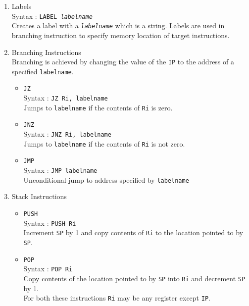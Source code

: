 \documentclass[11pt]{article}
\begin{document}
\begin{enumerate}
\item Labels \\
Syntax : \texttt{LABEL \textit{labelname}} \\
Creates a label with a \texttt{\textit{labelname}}  which is a string. Labels are used in branching instruction to specify memory location of target instructions.


\item Branching Instructions\\
Branching is achieved by changing the value of the \texttt{IP} to the address of a specified \texttt{labelname}. 
 
\begin{itemize}
\item \texttt{JZ}\\
Syntax : \texttt{JZ Ri, labelname}\\
Jumps to \texttt{labelname} if the contents of \texttt{Ri} is zero.
\item \texttt{JNZ}\\
Syntax : \texttt{JNZ Ri, labelname}\\
Jumps to \texttt{labelname} if the contents of \texttt{Ri} is not zero.
\item \texttt{JMP}\\
Syntax : \texttt{JMP labelname}\\
Unconditional jump to address specified by \texttt{labelname}\\

\end{itemize}

\item Stack Instructions
\begin{itemize}
\item \texttt{PUSH}\\
Syntax : \texttt{PUSH Ri}\\
Increment \texttt{SP} by 1 and copy contents of \texttt{Ri} to the location pointed to by \texttt{SP}.
\item \texttt{POP}\\
Syntax : \texttt{POP Ri}\\
Copy contents of the location pointed to by \texttt{SP} into \texttt{Ri} and decrement \texttt{SP} by 1.\\
For both these instructions \texttt{Ri} may be any register except \texttt{IP}.
\end{itemize}


\end{enumerate}
\end{document}
